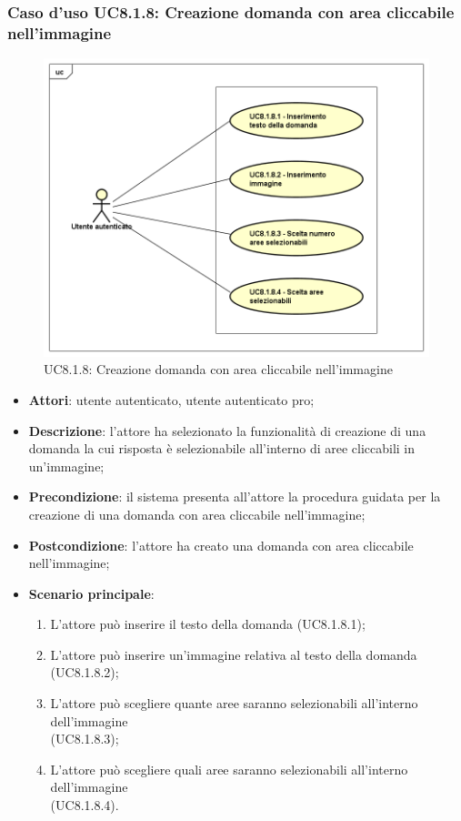 \subsubsection{Caso d'uso UC8.1.8: Creazione domanda con area cliccabile nell'immagine}
\label{UC8.1.8}
\begin{figure}[ht]
	\centering
	\includegraphics[scale=0.5,keepaspectratio]{UML/UC8_1_8.png}
	\caption{UC8.1.8: Creazione domanda con area cliccabile nell'immagine}
\end{figure}
\FloatBarrier
\begin{itemize}
	\item \textbf{Attori}: utente autenticato, utente autenticato pro;
	\item \textbf{Descrizione}: l'attore ha selezionato la funzionalità di creazione di una domanda la cui risposta è selezionabile all'interno di aree cliccabili in un'immagine;
	\item \textbf{Precondizione}: il sistema presenta all'attore la procedura guidata per la creazione di una domanda con area cliccabile nell'immagine;
	\item \textbf{Postcondizione}: l'attore ha creato una domanda con area cliccabile nell'immagine;
	\item \textbf{Scenario principale}:
		\begin{enumerate}
	       	\item L'attore può inserire il testo della domanda (UC8.1.8.1);
	        \item L'attore può inserire un'immagine relativa al testo della domanda (UC8.1.8.2);
		\item L'attore può scegliere quante aree saranno selezionabili all'interno dell'immagine \\(UC8.1.8.3);
		\item L'attore può scegliere quali aree saranno selezionabili all'interno dell'immagine \\(UC8.1.8.4).
	 	\end{enumerate}
\end{itemize}

